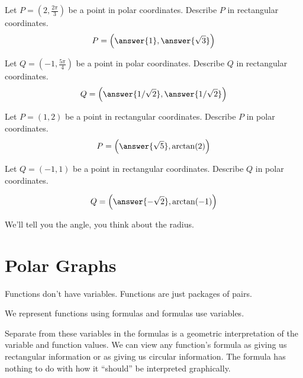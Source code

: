 \documentclass{ximera}
\begin{document}
\begin{question}
  Let $P=\left( 2,\frac{2\pi}{3} \right)$ be a point in polar coordinates. Describe $P$ in
  rectangular coordinates.
    \[
    P = \left( \answer{1}, \answer{\sqrt{3}} \right)
    \]
\end{question}

  \begin{question}
  Let $Q=(-1,\frac{5\pi}{4})$ be a point in polar coordinates. Describe $Q$ in
  rectangular coordinates.
    \[
    Q = \left( \answer{1/\sqrt{2}}, \answer{1/\sqrt{2}} \right)
    \]
\end{question}


\begin{question}
  Let $P=(1,2)$ be a point in rectangular coordinates. Describe $P$ in
  polar coordinates.
    \[
    P = \left( \answer{\sqrt{5}}, \arctan(2) \right)
    \]
\end{question}


  \begin{question}
  Let $Q=(-1,1)$ be a point in rectangular coordinates. Describe $Q$ in
  polar coordinates.

    \[
    Q = \left( \answer{-\sqrt{2}}, \arctan(-1) \right)
    \]
    \begin{hint}
      We'll tell you the angle, you think about the radius.
    \end{hint}
\end{question}



















\section*{Polar Graphs}

Functions don't have variables. Functions are just packages of pairs. 

We represent functions using formulas and formulas use variables. 

Separate from these variables in the formulas is a geometric interpretation of the variable and function values.  We can view any function's formula as giving us rectangular information or as giving us circular information.  The formula has nothing to do with how it ``should'' be interpreted graphically.
\end{document}
